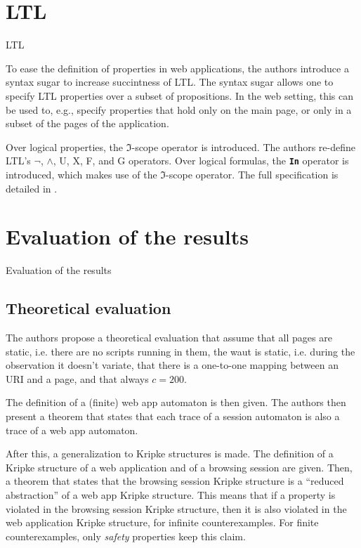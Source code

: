 \documentclass[usenames,dvipsnames]{beamer}
\begin{document}
\section{LTL}
\begin{frame}{LTL}

To ease the definition of properties in web applications, the authors introduce a syntax sugar to increase succintness of LTL. The syntax sugar allows one to specify LTL properties over a subset of propositions. In the web setting, this can be used to, e.g., specify properties that hold only on the main page, or only in a subset of the pages of the application.

Over logical properties, the $\mathcal{\Im}$-scope operator is introduced. The authors re-define LTL's $\neg$, $\land$, U, X, F, and G operators. Over logical formulas, the \textbf{\texttt{In}} operator is introduced, which makes use of the $\mathcal{\Im}$-scope operator. The full specification is detailed in \cite{Haydar2005}.

\end{frame}

\section{Evaluation of the results}
\begin{frame}{Evaluation of the results}

\subsection{Theoretical evaluation}

The authors propose a theoretical evaluation that assume that all pages are static, i.e. there are no scripts running in them, the \gls{waut} is static, i.e. during the observation it doesn't variate, that there is a one-to-one mapping between an URI and a page, and that always $c = 200$.

The definition of a (finite) web app automaton is then given. The authors then present a theorem that states that each trace of a session automaton is also a trace of a web app automaton.

After this, a generalization to Kripke structures is made. The definition of a Kripke structure of a web application and of a browsing session are given. Then, a theorem that states that the browsing session Kripke structure is a ``reduced abstraction'' of a web app Kripke structure. This means that if a property is violated in the browsing session Kripke structure, then it is also violated in the web application Kripke structure, for infinite counterexamples. For finite counterexamples, only \textit{safety} properties keep this claim.

\end{frame}
\end{document}
